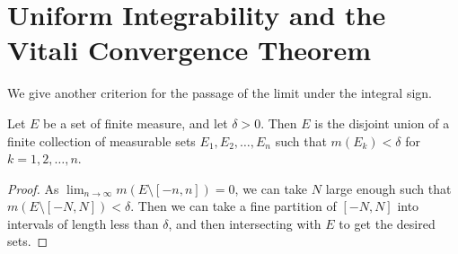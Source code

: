 \documentclass[../main.tex]{subfiles}
\begin{document}
\section{Uniform Integrability and the Vitali Convergence Theorem}
We give another criterion for the passage of the limit under the integral sign.

\begin{lemma}{}{}
	Let $E$ be a set of finite measure, and let $\delta > 0$. Then $E$ is the disjoint union of a finite collection of measurable sets $E_1, E_2, \ldots, E_n$ such that $m(E_k) < \delta$ for $k = 1, 2, \ldots, n$.
\end{lemma}
\begin{proof}
	As $\lim_{n \to \infty } m(E \setminus [-n, n]) = 0$, we can take $N$ large enough such that $m(E \setminus [-N, N]) < \delta$. Then we can take a fine partition of $[-N, N]$ into intervals of length less than $\delta$, and then intersecting with $E$ to get the desired sets.
\end{proof}
\end{document}
